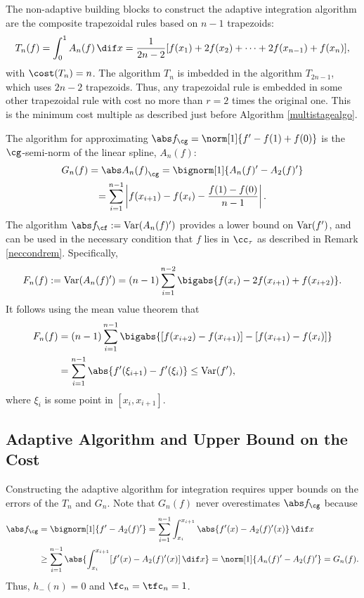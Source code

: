 The non-adaptive building blocks to construct the adaptive integration algorithm are the composite trapezoidal rules based on $n-1$ trapezoids:
\begin{equation*}
    T_{n}(f) = \int_0^1 A_n(f) \, \dif x 
    =\frac{1}{2n-2}[f(x_1)+2f(x_2)+\cdots+2f(x_{n-1})+f(x_n)],
\end{equation*}
with $\cost(T_n)=n$.  The algorithm $T_n$ is imbedded in the algorithm $T_{2n-1}$, which uses $2n-2$ trapezoids.  Thus, any trapezoidal rule is embedded in some other trapezoidal rule with cost no more than $r=2$ times the original one.  This is the minimum cost multiple as described just before Algorithm \ref{multistagealgo}.  

The algorithm for approximating $\Gnorm{f}=\norm[1]{f'-f(1)+f(0)}$ is the $\cg$-semi-norm of the linear spline, $A_n(f)$:
\begin{multline}\label{1direst}
    G_n(f)=\Gnorm{A_n(f)}=\bignorm[1]{A_n(f)'-A_2(f)'} \\
    =\sum_{i=1}^{n-1}\left|f(x_{i+1})-f(x_{i}) - \frac{f(1)-f(0)}{n-1}\right|.
\end{multline} 
The algorithm $\Fnorm{f}:=\Var(A_n(f)')$  provides a lower bound on $\operatorname{Var}(f')$, and can be used in the necessary condition that $f$ lies in $\cc_\tau$ as described in Remark \ref{neccondrem}.  Specifically,
\begin{equation} \label{Fnormalg}
F_n(f) :=\Var(A_n(f)') = (n-1)\sum_{i=1}^{n-2} \bigabs{f(x_i) - 2 f(x_{i+1})+f(x_{i+2})}.
\end{equation}
It follows using the mean value theorem that 
\begin{align*}
F_n(f) &= (n-1)\sum_{i=1}^{n-1} \bigabs{[f(x_{i+2}) - f(x_{i+1})] - [f(x_{i+1}) - f(x_{i})]} \\
&= \sum_{i=1}^{n-1} \abs{f'(\xi_{i+1}) - f'(\xi_{i})} \le \Var(f'),
\end{align*}
where $\xi_i$ is some point in $[x_i,x_{i+1}]$.


\subsection{Adaptive Algorithm and Upper Bound on the Cost}

Constructing the adaptive algorithm for integration requires upper bounds on the errors of the $T_n$ and $G_n$.  Note that $G_{n}(f)$ never overestimates $\Gnorm{f}$ because 
\begin{align*}
\Gnorm{f} & = \bignorm[1]{f'-A_2(f)'} 
= \sum_{i=1}^{n-1} \int_{x_i}^{x_{i+1}} \abs{f'(x) - A_2(f)'(x)} \, \dif x \\
& \ge \sum_{i=1}^{n-1} \abs{\int_{x_i}^{x_{i+1}} [f'(x) - A_2(f)'(x)] \, \dif x}=\norm[1]{A_n(f)'-A_2(f)'} = G_n(f).
\end{align*}
Thus, $h_{-}(n)=0$ and $\fc_n=\tfc_n=1$. 


